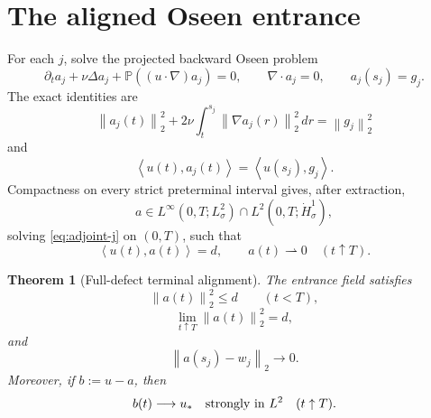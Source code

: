 \documentclass[11pt]{article}
\newtheorem{theorem}{Theorem}
\theoremstyle{remark}
\newcommand{\norm}[1]{\left\|#1\right\|}
\newcommand{\ip}[2]{\left\langle#1,#2\right\rangle}
\newcommand{\weakto}{\rightharpoonup}
\begin{document}
\section{The aligned Oseen entrance}

For each \(j\), solve the projected backward Oseen problem
\begin{equation}
\label{eq:adjoint-j}
 \partial_ta_j+\nu\Delta a_j
 +\mathbb P((u\cdot\nabla)a_j)=0,\qquad
 \nabla\cdot a_j=0,\qquad
 a_j(s_j)=g_j.
\end{equation}
The exact identities are
\begin{equation}
\label{eq:aj-energy}
 \norm{a_j(t)}_2^2
 +2\nu\int_t^{s_j}\norm{\nabla a_j(r)}_2^2\,dr
 =\norm{g_j}_2^2
\end{equation}
and
\begin{equation}
\label{eq:aj-pair}
 \ip{u(t)}{a_j(t)}
 =\ip{u(s_j)}{g_j}.
\end{equation}
Compactness on every strict preterminal interval gives, after
extraction,
\[
 a\in L^\infty(0,T;L^2_\sigma)
 \cap L^2(0,T;\dot H^1_\sigma),
\]
solving \eqref{eq:adjoint-j} on \((0,T)\), such that
\begin{equation}
\label{eq:a-pair-trace}
 \ip{u(t)}{a(t)}=d,\qquad
 a(t)\weakto0\quad(t\uparrow T).
\end{equation}

\begin{theorem}[Full-defect terminal alignment]
\label{thm:alignment}
The entrance field satisfies
\begin{equation}
\label{eq:a-upper}
 \norm{a(t)}_2^2\leq d\qquad(t<T),
\end{equation}
\begin{equation}
\label{eq:a-terminal-norm}
 \lim_{t\uparrow T}\norm{a(t)}_2^2=d,
\end{equation}
and
\begin{equation}
\label{eq:record-align}
 \norm{a(s_j)-w_j}_2\longrightarrow0.
\end{equation}
Moreover, if \(b:=u-a\), then
\begin{equation}
\label{eq:b-strong}
 b(t)\longrightarrow u_*
 \quad\hbox{strongly in }L^2
 \quad(t\uparrow T).
\end{equation}
\end{theorem}
\end{document}

